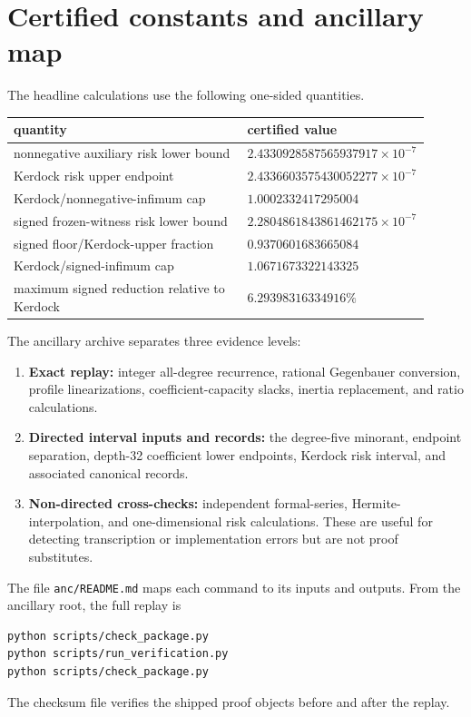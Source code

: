\documentclass[11pt]{article}
\begin{document}
\section{Certified constants and ancillary map}\label{app:verification}

The headline calculations use the following one-sided quantities.

\begin{center}
\begin{tabular}{@{}p{0.57\linewidth}p{0.34\linewidth}@{}}
\toprule
quantity & certified value \\
\midrule
nonnegative auxiliary risk lower bound & $2.4330928587565937917\times10^{-7}$ \\
Kerdock risk upper endpoint & $2.4336603575430052277\times10^{-7}$ \\
Kerdock/nonnegative-infimum cap & $1.0002332417295004$ \\
signed frozen-witness risk lower bound & $2.2804861843861462175\times10^{-7}$ \\
signed floor/Kerdock-upper fraction & $0.9370601683665084$ \\
Kerdock/signed-infimum cap & $1.0671673322143325$ \\
maximum signed reduction relative to Kerdock & $6.29398316334916\%$ \\
\bottomrule
\end{tabular}
\end{center}

The ancillary archive separates three evidence levels:

\begin{enumerate}
\item \textbf{Exact replay:} integer all-degree recurrence, rational
Gegenbauer conversion, profile linearizations, coefficient-capacity slacks,
inertia replacement, and ratio calculations.
\item \textbf{Directed interval inputs and records:} the degree-five
minorant, endpoint separation, depth-32 coefficient lower endpoints, Kerdock
risk interval, and associated canonical records.
\item \textbf{Non-directed cross-checks:} independent formal-series,
Hermite-interpolation, and one-dimensional risk calculations. These are useful
for detecting transcription or implementation errors but are not proof
substitutes.
\end{enumerate}

The file \texttt{anc/README.md} maps each command to its inputs and
outputs. From the ancillary root, the full replay is
\begin{verbatim}
python scripts/check_package.py
python scripts/run_verification.py
python scripts/check_package.py
\end{verbatim}
The checksum file verifies the shipped proof objects before and after the
replay.

\renewcommand\refname{References}
  \footnotesize
  \setlength{\bibsep}{0pt}
  
\end{document}
